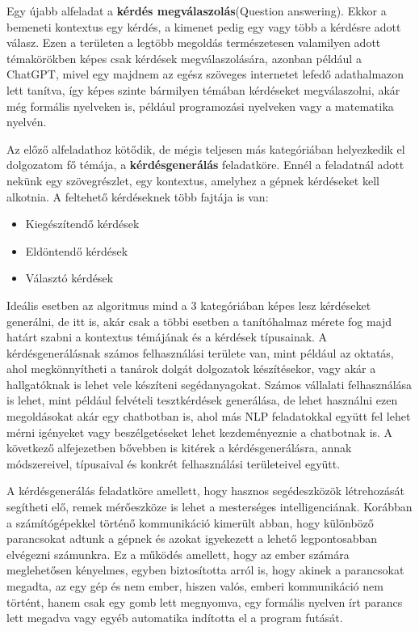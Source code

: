 	Egy újabb alfeladat a \textbf{kérdés megválaszolás}(Question answering). Ekkor a bemeneti kontextus egy kérdés, a kimenet pedig egy vagy több a kérdésre adott válasz. Ezen a területen a legtöbb megoldás természetesen valamilyen adott témakörökben képes csak kérdések megválaszolására, azonban például a ChatGPT, mivel egy majdnem az egész szöveges internetet lefedő adathalmazon lett tanítva, így képes szinte bármilyen témában kérdéseket megválaszolni, akár még formális nyelveken is, például programozási nyelveken vagy a matematika nyelvén.
	
	Az előző alfeladathoz kötődik, de mégis teljesen más kategóriában helyezkedik el dolgozatom fő témája, a \textbf{kérdésgenerálás} feladatköre. Ennél a feladatnál adott nekünk egy szövegrészlet, egy kontextus, amelyhez a gépnek kérdéseket kell alkotnia. A feltehető kérdéseknek több fajtája is van:

\begin{itemize}
\item Kiegészítendő kérdések
\item Eldöntendő kérdések
\item Választó kérdések
\end{itemize}

Ideális esetben az algoritmus mind a 3 kategóriában képes lesz kérdéseket generálni, de itt is, akár csak a többi esetben a tanítóhalmaz mérete fog majd határt szabni a kontextus témájának és a kérdések típusainak. A kérdésgenerálásnak számos felhasználási területe van, mint például az oktatás, ahol megkönnyítheti a tanárok dolgát dolgozatok készítésekor, vagy akár a hallgatóknak is lehet vele készíteni segédanyagokat. Számos vállalati felhasználása is lehet, mint például felvételi tesztkérdések generálása, de lehet használni ezen megoldásokat akár egy chatbotban is, ahol más NLP feladatokkal együtt fel lehet mérni igényeket vagy beszélgetéseket lehet kezdeményeznie a chatbotnak is. A következő alfejezetben bővebben is kitérek a kérdésgenerálásra, annak módszereivel, típusaival és konkrét felhasználási területeivel együtt.
 

A kérdésgenerálás feladatköre amellett, hogy hasznos segédeszközök létrehozását segítheti elő, remek mérőeszköze is lehet a mesterséges intelligenciának. Korábban a számítógépekkel történő kommunikáció kimerült abban, hogy különböző parancsokat adtunk a gépnek és azokat igyekezett a lehető legpontosabban elvégezni számunkra. Ez a működés amellett, hogy az ember számára meglehetősen kényelmes, egyben biztosította arról is, hogy akinek a parancsokat megadta, az egy gép és nem ember, hiszen valós, emberi kommunikáció nem történt, hanem csak egy gomb lett megnyomva, egy formális nyelven írt parancs lett megadva vagy egyéb automatika indította el a program futását.


